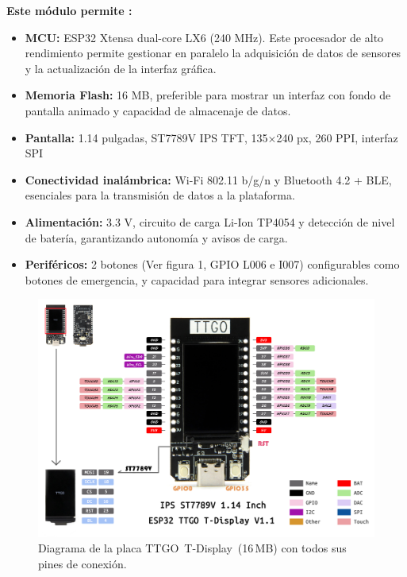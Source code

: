 \documentclass[12pt, a4paper]{article}
\begin{document}
	\noindent\textbf{Este módulo permite \cite{TTGO2021}:}
	\begin{itemize}
		\item \textbf{MCU:} ESP32 Xtensa dual-core LX6 (240 MHz). Este procesador de alto rendimiento permite gestionar en paralelo la adquisición de datos de sensores y la actualización de la interfaz gráfica.
		\item \textbf{Memoria Flash:} 16 MB, preferible para mostrar un interfaz con fondo de pantalla animado y capacidad de almacenaje de datos.
		\item \textbf{Pantalla:} 1.14 pulgadas, ST7789V IPS TFT, 135×240 px, 260 PPI, interfaz SPI
		\item \textbf{Conectividad inalámbrica:} Wi-Fi 802.11 b/g/n y Bluetooth 4.2 + BLE, esenciales para la transmisión de datos a la plataforma.
		\item \textbf{Alimentación:} 3.3 V, circuito de carga Li-Ion TP4054 y detección de nivel de batería, garantizando autonomía y avisos de carga.
		\item \textbf{Periféricos:} 2 botones (Ver figura 1, GPIO L006 e I007) configurables como botones de emergencia, y capacidad para integrar sensores adicionales.
	\end{itemize}
		
	\begin{figure}[htbp]
		\centering
		\includegraphics[width=1\textwidth]{images/TTGO_T-Display.jpg}
		\caption[Diagrama de pines de la TTGO T-Display]{Diagrama de la placa \mbox{TTGO T-Display (16\,MB)} con todos sus pines de conexión.}
		\label{fig:ttgo_tdisplay_pines}
	\end{figure}
	
\end{document}
